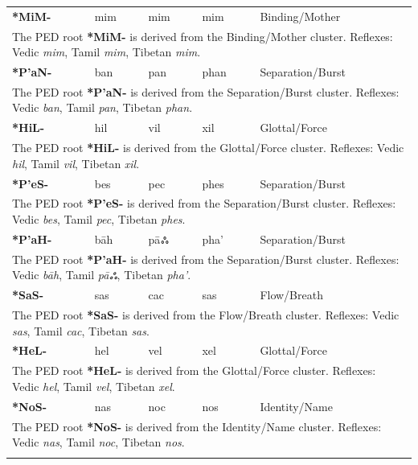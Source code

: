\begin{longtable}{p{} p{} p{} p{} p{}}
\textbf{*MiM-} & mim & mim & mim & Binding/Mother \\ 
\multicolumn{5}{p{\textwidth}}{\small The PED root \textbf{*MiM-} is derived from the Binding/Mother cluster. Reflexes: Vedic \textit{mim}, Tamil \textit{mim}, Tibetan \textit{mim}. } \\ \addlinespace 
\textbf{*P'aN-} & ban & pan & phan & Separation/Burst \\ 
\multicolumn{5}{p{\textwidth}}{\small The PED root \textbf{*P'aN-} is derived from the Separation/Burst cluster. Reflexes: Vedic \textit{ban}, Tamil \textit{pan}, Tibetan \textit{phan}. } \\ \addlinespace 
\textbf{*HiL-} & hil & vil & xil & Glottal/Force \\ 
\multicolumn{5}{p{\textwidth}}{\small The PED root \textbf{*HiL-} is derived from the Glottal/Force cluster. Reflexes: Vedic \textit{hil}, Tamil \textit{vil}, Tibetan \textit{xil}. } \\ \addlinespace 
\textbf{*P'eS-} & bes & pec & phes & Separation/Burst \\ 
\multicolumn{5}{p{\textwidth}}{\small The PED root \textbf{*P'eS-} is derived from the Separation/Burst cluster. Reflexes: Vedic \textit{bes}, Tamil \textit{pec}, Tibetan \textit{phes}. } \\ \addlinespace 
\textbf{*P'aH-} & bāh & pāஃ & pha' & Separation/Burst \\ 
\multicolumn{5}{p{\textwidth}}{\small The PED root \textbf{*P'aH-} is derived from the Separation/Burst cluster. Reflexes: Vedic \textit{bāh}, Tamil \textit{pāஃ}, Tibetan \textit{pha'}. } \\ \addlinespace 
\textbf{*SaS-} & sas & cac & sas & Flow/Breath \\ 
\multicolumn{5}{p{\textwidth}}{\small The PED root \textbf{*SaS-} is derived from the Flow/Breath cluster. Reflexes: Vedic \textit{sas}, Tamil \textit{cac}, Tibetan \textit{sas}. } \\ \addlinespace 
\textbf{*HeL-} & hel & vel & xel & Glottal/Force \\ 
\multicolumn{5}{p{\textwidth}}{\small The PED root \textbf{*HeL-} is derived from the Glottal/Force cluster. Reflexes: Vedic \textit{hel}, Tamil \textit{vel}, Tibetan \textit{xel}. } \\ \addlinespace 
\textbf{*NoS-} & nas & noc & nos & Identity/Name \\ 
\multicolumn{5}{p{\textwidth}}{\small The PED root \textbf{*NoS-} is derived from the Identity/Name cluster. Reflexes: Vedic \textit{nas}, Tamil \textit{noc}, Tibetan \textit{nos}. } \\ \addlinespace 

\end{longtable}
